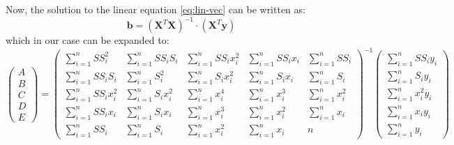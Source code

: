 Now, the solution to the linear equation \ref{eq:lin-vec} can be written as:
\begin{equation}
	\boldsymbol{b}=\left(\boldsymbol{X}^T\boldsymbol{X}\right)^{-1}\cdot (\boldsymbol{X}^T\boldsymbol{y})
\end{equation}
which in our case can be expanded to:
\begin{equation}
	\label{eq:lin-reg}
	\begin{pmatrix}
		A \\
		B \\
		C \\
		D \\
		E  
	\end{pmatrix} 
	=
	\begin{pmatrix}
		\sum\limits_{i=1}^nSS_i^2 & \sum\limits_{i=1}^nSS_iS_i & \sum\limits_{i=1}^nSS_ix_i^2 & \sum\limits_{i=1}^nSS_ix_i & \sum\limits_{i=1}^nSS_i \\
		\sum\limits_{i=1}^nSS_iS_i & \sum\limits_{i=1}^nS_i^2 & \sum\limits_{i=1}^nS_ix_i^2 & \sum\limits_{i=1}^nS_ix_i & \sum\limits_{i=1}^nS_i \\
		\sum\limits_{i=1}^nSS_ix_i^2 & \sum\limits_{i=1}^nS_ix_i^2 & \sum\limits_{i=1}^nx_i^4 & \sum\limits_{i=1}^nx_i^3 & \sum\limits_{i=1}^nx_i^2 \\
		\sum\limits_{i=1}^nSS_ix_i & \sum\limits_{i=1}^nS_ix_i & \sum\limits_{i=1}^nx_i^3 & \sum\limits_{i=1}^nx_i^2 & \sum\limits_{i=1}^nx_i \\
		\sum\limits_{i=1}^nSS_i & \sum\limits_{i=1}^nS_i & \sum\limits_{i=1}^nx_i^2 & \sum\limits_{i=1}^nx_i & n  
	\end{pmatrix}^{-1}
	\begin{pmatrix}
		\sum\limits_{i=1}^nSS_iy_i \\
		\sum\limits_{i=1}^nS_iy_i \\
		\sum\limits_{i=1}^nx_i^2y_i \\
		\sum\limits_{i=1}^nx_iy_i \\
		\sum\limits_{i=1}^ny_i  
	\end{pmatrix}
\end{equation}

